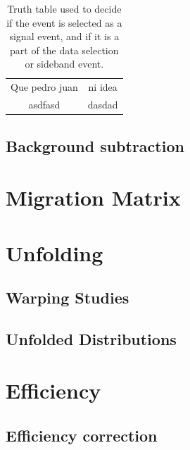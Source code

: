 \begin{table}[]
	
	\centering
	\begin{tabular}{c|c}
		Que pedro juan & ni idea \\
		asdfasd & dasdad
	\end{tabular}
	\caption{Truth table used to decide if the event is selected as a signal event, and if it is a part of the data selection or sideband event.}
	\label{tab:Analysis:BgStudies:SidebandTunning:WTruthTable}
\end{table}



\subsection{Background subtraction}

\section{Migration Matrix}



\section{Unfolding}

\subsection{Warping Studies}

\subsection{Unfolded Distributions}


\section{Efficiency}

\subsection{Efficiency correction}
